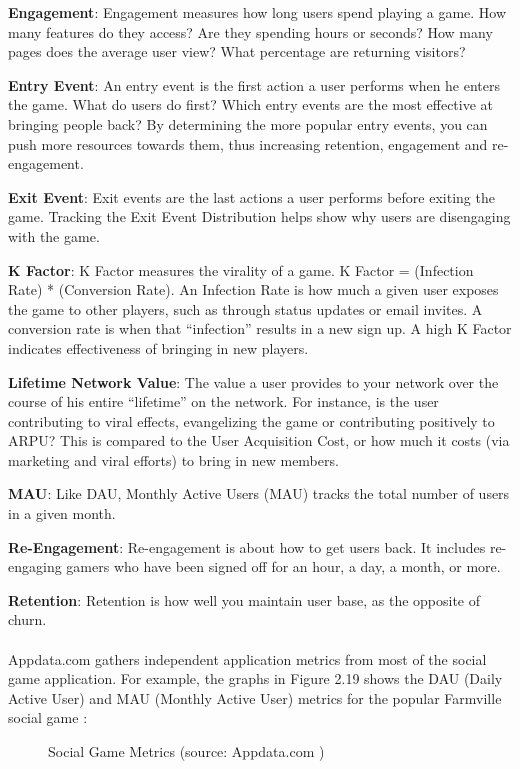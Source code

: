 \textbf{Engagement}: Engagement measures how long users spend playing a game. How many features do they access? Are they spending hours or seconds? How many pages does the average user view? What percentage are returning visitors?

\textbf{Entry Event}: An entry event is the first action a user performs when he  enters the game. What do users do first? Which entry events are the most effective at bringing people back? By determining the more popular entry events, you can push more resources towards them, thus increasing retention, engagement and re-engagement.

\textbf{Exit Event}: Exit events are the last actions a user performs before exiting the game. Tracking the Exit Event Distribution helps show why users are disengaging with the game.

\textbf{K Factor}: K Factor measures the virality of a game. K Factor = (Infection Rate) * (Conversion Rate). An Infection Rate is how much a given user exposes the game to other players, such as through status updates or email invites. A conversion rate is when that ``infection'' results in a new sign up. A high K Factor indicates effectiveness of bringing in new players.

\textbf{Lifetime Network Value}: The value a user provides to your network over the course of his entire ``lifetime'' on the network. For instance, is the user contributing to viral effects, evangelizing the game or contributing positively to ARPU? This is compared to the User Acquisition Cost, or how much it costs (via marketing and viral efforts) to bring in new members.

\textbf{MAU}: Like DAU, Monthly Active Users (MAU) tracks the total number of users in a given month.

\textbf{Re-Engagement}: Re-engagement is about how to get users back. It includes re-engaging gamers who have been signed off for an hour, a day, a month, or more. 

\textbf{Retention}: Retention is how well you maintain user base, as the opposite of churn. 
\\\\
Appdata.com gathers independent application metrics from most of the social game application. For example, the graphs in Figure 2.19 shows the DAU (Daily Active User) and MAU (Monthly Active User) metrics for the popular Farmville social game \cite {appdata2011}:

\begin{figure}[htbp]
	\centering
		\caption{Social Game Metrics (source: Appdata.com \cite {appdata2011})}
		\label{fig:social-game-metrics}
\end{figure}

